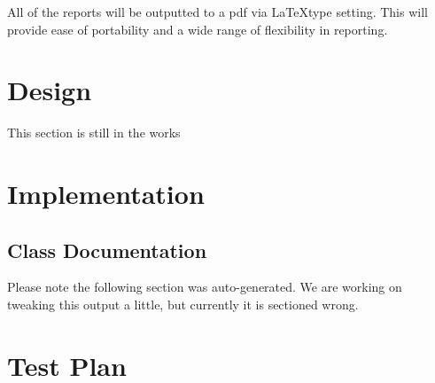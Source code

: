 \documentclass[a4paper,10pt]{article}
\begin{document}
All of the reports will be outputted to a pdf via \LaTeX type setting. This will provide ease of portability and a wide range of flexibility in reporting.

\section{Design}

This section is still in the works

\section{Implementation}

\subsection{Class Documentation}

Please note the following section was auto-generated. We are working on tweaking this output a little, but currently it is sectioned wrong.












\section{Test Plan}
\end{document}
